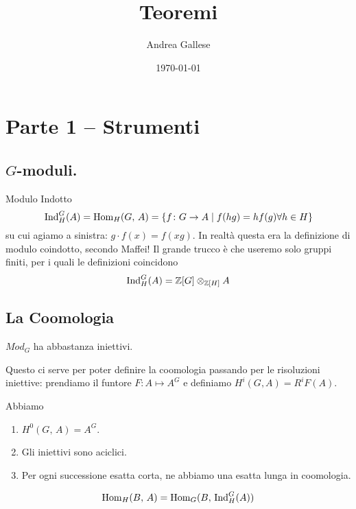 \documentclass[a4paper]{article}
\title{Teoremi}\let\Title\@title
\author{Andrea Gallese}\let\Author\@author
\date{\today}\let\Date\@date
\begin{document}
	\section{Parte 1 -- Strumenti}
	
	\subsection{$ G $-moduli.}
	\begin{definition}{Modulo Indotto}
		\[ \mathrm{Ind}_H^G(A) = \mathrm{Hom}_H(G, \, A) = \{ f \colon G \to A \mid f(hg) = h f(g) \forall h \in H \} \]
		su cui agiamo a sinistra: $ g \cdot f(x) = f(xg) $. In realtà questa era la definizione di modulo coindotto, secondo Maffei! Il grande trucco è che useremo solo gruppi finiti, per i quali le definizioni coincidono
		\[ \mathrm{Ind}_H^G(A) = \mathbb{Z}[G] \otimes_{\mathbb{Z}[H]} A \]
	\end{definition}

	\subsection{La Coomologia}
	\begin{lemma}
		$ Mod_G $ ha abbastanza iniettivi.
	\end{lemma}

	Questo ci serve per poter definire la coomologia passando per le risoluzioni iniettive: prendiamo il funtore $ F \colon A \mapsto A^G $ e definiamo $ H^i(G, A) = R^iF(A) $.
	
	\begin{theorem}
		Abbiamo
		\begin{enumerate}
			\item $ H^0(G,\, A) = A^G $.
			\item Gli iniettivi sono aciclici.
			\item Per ogni successione esatta corta, ne abbiamo una esatta lunga in coomologia.
		\end{enumerate}
	\end{theorem}

	\begin{lemma}
		\[ \mathrm{Hom}_H(B,\, A) = \mathrm{Hom}_G(B, \, \mathrm{Ind}_H^G(A)) \]
	\end{lemma}
	
	
\end{document}
